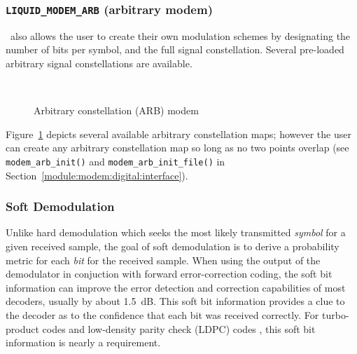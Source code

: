 \subsubsection{{\tt LIQUID\_MODEM\_ARB} (arbitrary modem)}
\label{module:modem:digital:ARB}
\liquid\ also allows the user to create their own modulation schemes by
designating the number of bits per symbol, and the full signal constellation.
Several pre-loaded arbitrary signal constellations are available.
%
\begin{figure}
\centering
\mbox{
   \quad
   \quad
}
\mbox{
   \quad
   \quad
}
\mbox{
   \quad
   \quad
}
\caption{Arbitrary constellation (ARB) modem}
\label{fig:modem:arb}
\end{figure}
%
Figure~\ref{fig:modem:arb} depicts several available arbitrary
constellation maps;
however the user can create any arbitrary constellation map so long as
no two points overlap
(see {\tt modem\_arb\_init()} and {\tt modem\_arb\_init\_file()} in
Section~\ref{module:modem:digital:interface}).

\subsubsection{Soft Demodulation}
\label{module:modem:digital:soft}
Unlike hard demodulation which seeks the most likely transmitted
{\em symbol} for a given received sample,
the goal of soft demodulation is to derive a probability metric for each
{\em bit} for the received sample.
When using the output of the demodulator in conjuction with forward
error-correction coding, the soft bit information can improve the error
detection and correction capabilities of most decoders,
usually by about 1.5~dB.
This soft bit information provides a clue to the decoder as to the
confidence that each bit was received correctly.
For turbo-product codes \cite{Berrou:1993} and
low-density parity check (LDPC) codes \cite{Gallager:1962},
this soft bit information is nearly a requirement.

